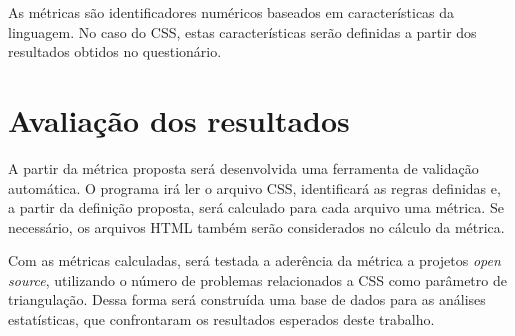 As métricas são identificadores numéricos baseados em características da linguagem. No caso do CSS, estas características serão definidas a partir dos resultados obtidos no questionário.

\section{Avaliação dos resultados}

A partir da métrica proposta será desenvolvida uma ferramenta de validação automática. O programa irá ler o arquivo CSS, identificará as regras definidas e, a partir da definição proposta, será calculado para cada arquivo uma métrica. Se necessário, os arquivos HTML também serão considerados no cálculo da métrica.

Com as métricas calculadas, será testada a aderência da métrica a projetos \textit{open source}, utilizando o número de problemas relacionados a CSS como parâmetro de triangulação. Dessa forma será construída uma base de dados para as análises estatísticas, que confrontaram os resultados esperados deste trabalho.
